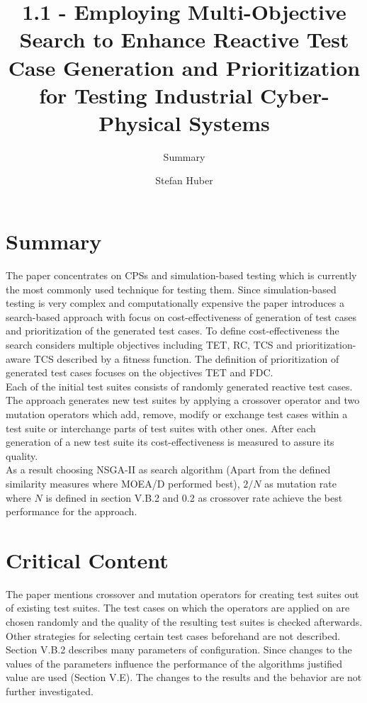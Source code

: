\documentclass[oneside, notitlepage, twocolumn]{scrartcl}
\title{1.1 - Employing Multi-Objective Search to Enhance Reactive Test Case Generation and Prioritization for Testing Industrial Cyber-Physical Systems}
\subtitle{Summary}
\author{Stefan Huber}
\begin{document}
\maketitle

\section{Summary}
The paper concentrates on \ac{CPS}s and simulation-based testing which is currently the most commonly used technique for testing them.
Since simulation-based testing is very complex and computationally expensive the paper introduces a search-based approach with focus on cost-effectiveness of generation of test cases and prioritization of the generated test cases.
To define cost-effectiveness the search considers multiple objectives including \ac{TET}, \ac{RC}, \ac{TCS} and prioritization-aware \ac{TCS} described by a fitness function.
The definition of prioritization of generated test cases focuses on the objectives \ac{TET} and \ac{FDC}.\\
Each of the initial test suites consists of randomly generated reactive test cases.
The approach generates new test suites  by applying a crossover operator and two mutation operators which add, remove, modify or exchange test cases within a test suite or interchange parts of test suites with other ones.
After each generation of a new test suite its cost-effectiveness is measured to assure its quality.\\
As a result choosing \ac{NSGA-II} as search algorithm (Apart from the defined similarity measures where \ac{MOEA/D} performed best), \(2/N\) as mutation rate where \(N\) is defined in section V.B.2 and 0.2 as crossover rate achieve the best performance for the approach.


\section{Critical Content}
The paper mentions crossover and mutation operators for creating test suites out of existing test suites.
The test cases on which the operators are applied on are chosen randomly and the quality of the resulting test suites is checked afterwards.
Other strategies for selecting certain test cases beforehand are not described.\\
Section V.B.2 describes many parameters of configuration.
Since changes to the values of the parameters influence the performance of the algorithms justified value are used (Section V.E).
The changes to the results and the behavior are not further investigated.
\end{document}
